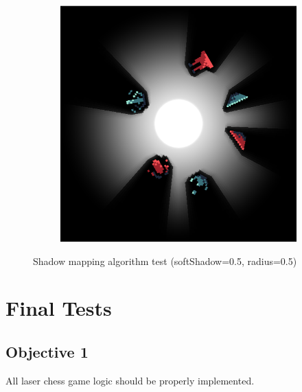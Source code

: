 \documentclass[../main/main.tex]{subfiles}
\begin{document}
\begin{figure}[H]
\begin{subfigure}[b]{0.3\columnwidth}
    \end{subfigure}
    \begin{subfigure}[b]{0.3\columnwidth}
    \includegraphics[width=\columnwidth]{../testing/assets/rays_example_3.png}
    \end{subfigure}

    \caption{Shadow mapping algorithm test (softShadow=0.5, radius=0.5)}
    \label{fig:rays-examples}
\end{figure}

\section{Final Tests}
\subsection{Objective 1}
All laser chess game logic should be properly implemented.
\end{document}
